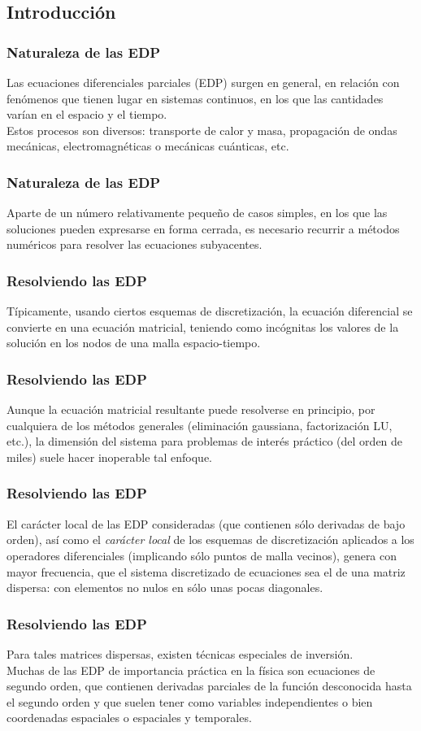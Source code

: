 \subsection{Introducción}
\begin{frame}
\frametitle{Naturaleza de las EDP}
Las ecuaciones diferenciales parciales (EDP) surgen en general, en relación con fenómenos que tienen lugar en sistemas continuos, en los que las cantidades varían en el espacio y el tiempo.
\\
\bigskip
\pause
Estos procesos son diversos: transporte de calor y masa, propagación de ondas mecánicas, electromagnéticas o mecánicas cuánticas, etc.
\end{frame}
\begin{frame}
\frametitle{Naturaleza de las EDP}
Aparte de un número relativamente pequeño de casos simples, en los que las soluciones pueden expresarse en forma cerrada, es necesario recurrir a métodos numéricos para resolver las ecuaciones subyacentes.
\end{frame}
\begin{frame}
\frametitle{Resolviendo las EDP}
Típicamente, usando ciertos esquemas de discretización, la ecuación diferencial se convierte en una ecuación matricial, teniendo como incógnitas los valores de la solución en los nodos de una malla espacio-tiempo.
\end{frame}
\begin{frame}
\frametitle{Resolviendo las EDP}
Aunque la ecuación matricial resultante puede resolverse en principio, por cualquiera de los métodos generales (eliminación gaussiana, factorización LU, etc.), la dimensión del sistema para problemas de interés práctico (del orden de miles) suele hacer inoperable tal enfoque.
\end{frame}
\begin{frame}
\frametitle{Resolviendo las EDP}
El carácter local de las EDP consideradas (que contienen sólo derivadas de bajo orden), así como el \emph{carácter local} de los esquemas de discretización aplicados a los operadores diferenciales (implicando sólo puntos de malla vecinos), genera con mayor frecuencia, que el sistema discretizado de ecuaciones sea el de una matriz dispersa: con elementos no nulos en sólo unas pocas diagonales.
\end{frame}
\begin{frame}
\frametitle{Resolviendo las EDP}
Para tales matrices dispersas, existen técnicas especiales de inversión.
\\
\bigskip
Muchas de las EDP de importancia práctica en la física son ecuaciones de segundo orden, que contienen derivadas parciales de la función desconocida hasta el segundo orden y que suelen tener como variables independientes o bien coordenadas espaciales o espaciales y temporales.
\end{frame}
